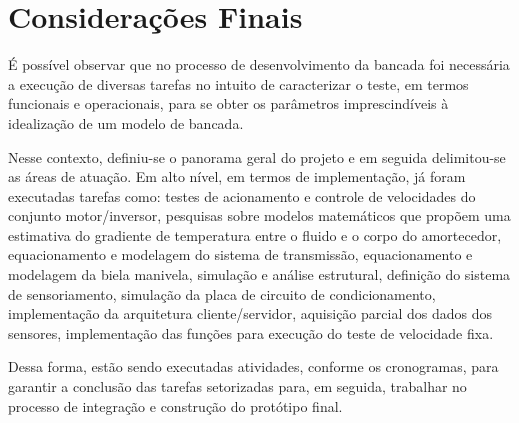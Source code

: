 \chapter[Considerações Finais]{Considerações Finais}
\label{chap:consideracoes}
	
	É possível observar que no processo de desenvolvimento da bancada foi necessária a execução de diversas tarefas no intuito de caracterizar o teste, em termos funcionais e operacionais, para se obter os parâmetros  imprescindíveis à idealização de um modelo de bancada.
	
	Nesse contexto, definiu-se o panorama geral do projeto e em seguida delimitou-se as áreas de atuação. Em alto nível, em termos de implementação, já foram executadas tarefas como: testes de acionamento e controle de velocidades do conjunto motor/inversor, pesquisas sobre modelos matemáticos que propõem uma estimativa do gradiente de temperatura entre o fluido e o corpo do amortecedor, equacionamento e modelagem do sistema de transmissão, equacionamento e modelagem da biela manivela, simulação e análise estrutural, definição do sistema de sensoriamento, simulação da placa de circuito de condicionamento, implementação da arquitetura cliente/servidor, aquisição parcial dos dados dos sensores, implementação das funções para execução do teste de velocidade fixa.
	
	Dessa forma, estão sendo executadas atividades, conforme os cronogramas, para garantir a conclusão das tarefas setorizadas para, em seguida, trabalhar no processo de integração e construção do protótipo final. 


	